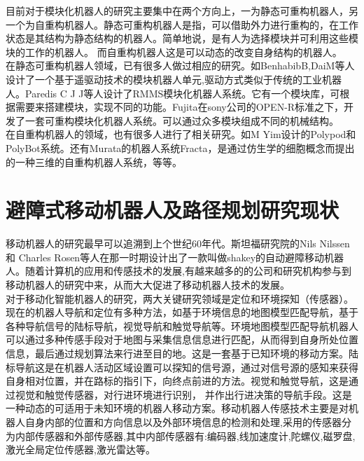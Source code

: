 目前对于模块化机器人的研究主要集中在两个方向上，一为静态可重构机器人，另一个为自重构机器人。静态可重构机器人是指，可以借助外力进行重构的，在工作状态是其结构为静态结构的机器人。简单地说，是有人为选择模块并可利用这些模块的工作的机器人。 而自重构机器人这是可以动态的改变自身结构的机器人。\\

在静态可重构机器人领域，已有很多人做过相应的研究。如BenhabibB,DaiM等人设计了一个基于遥驱动技术的模块机器人单元,驱动方式类似于传统的工业机器人。Paredis C J J等人设计了RMMS模块化机器人系统。它有一个模块库，可根据需要来搭建模块，实现不同的功能。Fujita在sony公司的OPEN-R标准之下，开发了一套可重构模块化机器人系统。可以通过众多模块组成不同的机械结构。 \\

在自重构机器人的领域，也有很多人进行了相关研究。如M Yim设计的Polypod和PolyBot系统。还有Murata的机器人系统Fracta，是通过仿生学的细胞概念而提出的一种三维的自重构机器人系统，等等。 \\


\section{避障式移动机器人及路径规划研究现状}
移动机器人的研究最早可以追溯到上个世纪60年代。斯坦福研究院的Nils Nilssen和 Charles Rosen等人在那一时期设计出了一款叫做shakey的自动避障移动机器人。随着计算机的应用和传感技术的发展,有越来越多的的公司和研究机构参与到移动机器人的研究中来，从而大大促进了移动机器人技术的发展。 \\

对于移动化智能机器人的研究，两大关键研究领域是定位和环境探知（传感器）。现在的机器人导航和定位有多种方法，如基于环境信息的地图模型匹配导航，基于各种导航信号的陆标导航，视觉导航和触觉导航等。环境地图模型匹配导航机器人可以通过多种传感手段对于地图与采集信息信息进行匹配，从而得到自身所处位置信息，最后通过规划算法来行进至目的地。这是一套基于已知环境的移动方案。陆标导航这是在机器人活动区域设置可以探知的信号源，通过对信号源的感知来获得自身相对位置，并在路标的指引下，向终点前进的方法。视觉和触觉导航，这是通过视觉和触觉传感器，对行进环境进行识别， 并作出行进决策的导航手段。这是一种动态的可适用于未知环境的机器人移动方案。移动机器人传感技术主要是对机器人自身内部的位置和方向信息以及外部环境信息的检测和处理,采用的传感器分为内部传感器和外部传感器,其中内部传感器有:编码器,线加速度计,陀螺仪,磁罗盘,激光全局定位传感器,激光雷达等。 \\


